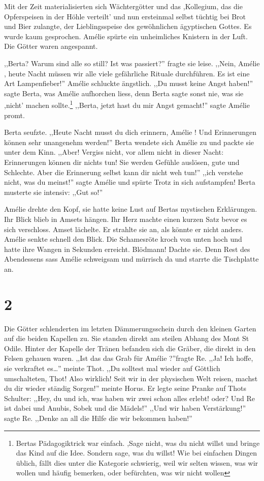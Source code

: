 \documentclass[11pt,titlepage,a5paper]{book}
\newcommand{\am}{Amélie }
\begin{document}
Mit der Zeit materialisierten sich Wächtergötter und das ,Kollegium, das die Opferspeisen in der Höhle verteilt' und nun ersteinmal selbst tüchtig bei Brot und Bier zulangte, der Lieblingsspeise des gewöhnlichen ägyptischen Gottes. Es wurde kaum gesprochen. \am spürte ein unheimliches Knistern in der Luft. Die Götter waren angespannt. 

,,Berta? Warum sind alle so still? Ist was passiert?'' fragte sie leise. ,,Nein, \am , heute Nacht müssen wir alle viele gefährliche Rituale durchführen. Es ist eine Art Lampenfieber!'' \am schluckte ängstlich. ,,Du musst keine Angst haben!'' sagte Berta, was \am aufhorchen liess, denn Berta sagte sonst nie, was sie ,nicht' machen sollte.\footnote{Bertas Pädagogiktrick war einfach. ,Sage nicht, was du nicht willst und bringe das Kind auf die Idee. Sondern sage, was du willst! Wie bei einfachen Dingen üblich, fällt dies unter die Kategorie schwierig, weil wir selten wissen, was wir wollen und häufig bemerken, oder befürchten, was wir nicht wollen} ,,Berta, jetzt hast du mir Angst gemacht!'' sagte \am promt.

Berta seufzte. ,,Heute Nacht musst du dich erinnern, \am ! Und Erinnerungen können sehr unangenehm werden!'' Berta wendete sich \am zu und packte sie unter dem Kinn. ,,Aber! Vergiss nicht, vor allem nicht in dieser Nacht: Erinnerungen können dir nichts tun! Sie werden Gefühle auslösen, gute und Schlechte. Aber die Erinnerung selbst kann dir nicht weh tun!'' ,,ich verstehe nicht, was du meinst!'' sagte \am und spürte Trotz in sich aufstampfen! Berta musterte sie intensiv: ,,Gut so!''

\am drehte den Kopf, sie hatte keine Lust auf Bertas mystischen Erklärungen. Ihr Blick blieb in Amsets hängen. Ihr Herz machte einen kurzen Satz bevor es sich verschloss. Amset lächelte. Er strahlte sie an, als könnte er nicht anders. \am senkte schnell den Blick. Die Schamesröte kroch von unten hoch und hatte ihre Wangen in Sekunden erreicht. Blödmann! Dachte sie. Denn Rest des Abendessens sass \am schweigsam und mürrisch da und starrte die Tischplatte an.

\section*{2}

Die Götter schlenderten im letzten Dämmerungsschein durch den kleinen Garten auf die beiden Kapellen zu. Sie standen direkt am steilen Abhang des Mont St Odile. Hinter der Kapelle der Tränen befanden sich die Gräber, die direkt in den Felsen gehauen waren. ,,Ist das das Grab für \am ?''fragte Re. ,,Ja! Ich hoffe, sie verkraftet es\dots '' meinte Thot. ,,Du solltest mal wieder auf Göttlich umschalteten, Thot! Also wirklich! Seit wir in der physischen Welt reisen, machst du dir wieder ständig Sorgen!'' meinte Horus. Er legte seine Pranke auf Thots Schulter: ,,Hey, du und ich, was haben wir zwei schon alles erlebt! oder? Und Re ist dabei und Anubis, Sobek und die Mädels!'' ,,Und wir haben Verstärkung!'' sagte Re. ,,Denke an all die Hilfe die wir bekommen haben!''
\end{document}
